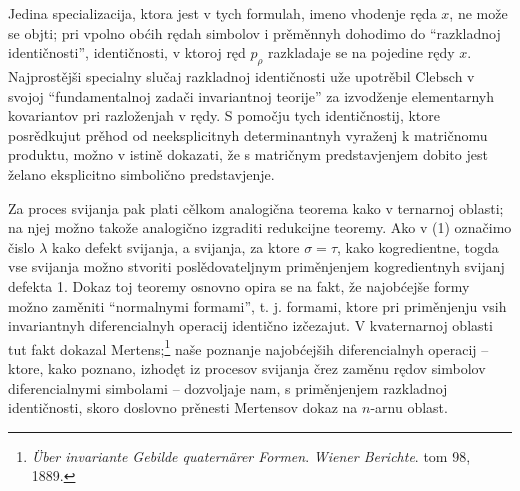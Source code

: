 \documentclass[11pt]{article}
\begin{document}
Jedina specializacija, ktora jest v tych formulah, imeno vhodenje ręda $x$, ne može se objti; pri vpolno obćih rędah simbolov i prěměnnyh dohodimo do ``razkladnoj identičnosti'', identičnosti, v ktoroj ręd $p_\rho$ razkladaje se na pojedine rędy $x$. Najprostějši specialny slučaj razkladnoj identičnosti uže upotrěbil Clebsch v svojoj ``fundamentalnoj zadači invariantnoj teorije'' za izvodženje elementarnyh kovariantov pri razloženjah v rędy. S pomočju tych identičnostij, ktore posrědkujut prěhod od neeksplicitnyh determinantnyh vyraženj k matričnomu produktu, možno v istině dokazati, že s matričnym predstavjenjem dobito jest želano eksplicitno simbolično predstavjenje.

Za proces svijanja pak plati cělkom analogična teorema kako v ternarnoj oblasti; na njej možno takože analogično izgraditi redukcijne teoremy. Ako v (1) označimo čislo $\lambda$ kako defekt svijanja, a svijanja, za ktore $\sigma=\tau$, kako kogredientne, togda vse svijanja možno stvoriti poslědovateljnym priměnjenjem kogredientnyh svijanj defekta 1. Dokaz toj teoremy osnovno opira se na fakt, že najobćejše formy možno zaměniti ``normalnymi formami'', t. j. formami, ktore pri priměnjenju vsih invariantnyh diferencialnyh operacij identično izčezajut. V kvaternarnoj oblasti tut fakt dokazal Mertens;\footnote{\emph{Über invariante Gebilde quaternärer Formen}. \emph{Wiener Berichte}. tom 98, 1889.} naše poznanje najobćejših diferencialnyh operacij -- ktore, kako poznano, izhodęt iz procesov svijanja črez zaměnu rędov simbolov diferencialnymi simbolami -- dozvoljaje nam, s priměnjenjem razkladnoj identičnosti, skoro doslovno prěnesti Mertensov dokaz na $n$-arnu oblast.
\end{document}

